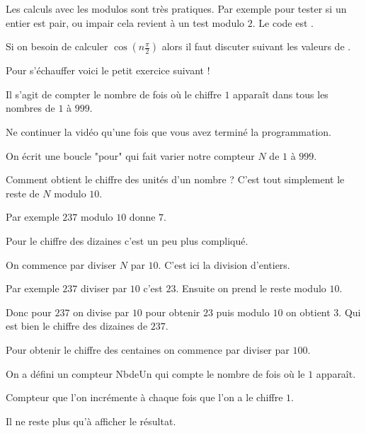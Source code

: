 \change

Les calculs avec les modulos sont très pratiques.
Par exemple pour tester si un entier est pair, ou impair cela revient à un test modulo $2$.
Le code est .

\change

Si on besoin de calculer $\cos( n\frac\pi2)$ alors il faut discuter
suivant les valeurs de .

\diapo

Pour s'échauffer voici le petit exercice suivant !

Il s'agit de compter le nombre de fois où le chiffre $1$ apparaît dans tous les nombres
de $1$ à $999$.

Ne continuer la vidéo qu'une fois que vous avez terminé la programmation.


\change

On écrit une boucle "pour" qui fait varier notre compteur $N$ de $1$ à $999$.

Comment obtient le chiffre des unités d'un nombre ? C'est tout simplement le reste
de $N$ modulo $10$.

Par exemple $237$ modulo $10$ donne $7$.

\change

Pour le chiffre des dizaines c'est un peu plus compliqué.

On commence par diviser $N$ par $10$. C'est ici la division d'entiers.

Par exemple $237$ diviser par $10$ c'est $23$. 
Ensuite on prend le reste modulo $10$.

Donc pour $237$ on divise par $10$ pour obtenir $23$ puis modulo $10$ on obtient $3$.
Qui est bien le chiffre des dizaines de $237$.

\change

Pour obtenir le chiffre des centaines on commence par diviser par $100$.


\change

On a défini un compteur NbdeUn qui compte le nombre de fois où le $1$ apparaît.

\change

Compteur que l'on incrémente à chaque fois que l'on a le chiffre $1$.

\change

\change

Il ne reste plus qu'à afficher le résultat.


\diapo

